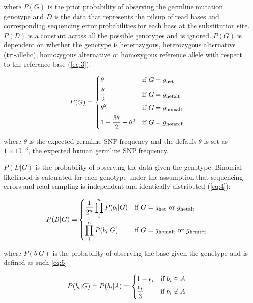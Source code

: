 where $P(G)$ is the prior probability of observing the germline mutation genotype and $D$ is the data that represents the pileup of read bases and corresponding sequencing error probabilities for each base at the substitution site. $P(D)$ is a constant across all the possible genotypes and is ignored. $P(G)$ is dependent on whether the genotype is heterozygous, heterozygous alternative (tri-allelic), homozygous alternative or homozygous reference allele with respect to the reference base (\ref{eq:3}):

\begin{equation} \label{eq:3}
 P(G)= 
 	\begin{dcases}
    	\theta & \text{if } G = g_{\text{het}} \\
	    \frac{\theta}{2} & \text{if } G = g_{\text{hetalt}} \\
		\theta^{2} & \text{if } G = g_{\text{homalt}} \\
		1 - \frac{3\theta}{2} - \theta^{2} & \text{if } G = g_{\text{homref}} \\
	\end{dcases} \smallskip
\end{equation}

where $\theta$ is the expected germline SNP frequency and the default $\theta$ is set as $1\times10^{-3}$, the expected human germline SNP frequency. 

$P(D|G)$ is the probability of observing the data given the genotype. Binomial likelihood is calculated for each genotype under the assumption that sequencing errors and read sampling is independent and identically distributed (\ref{eq:4}):

\begin{equation} \label{eq:4}
P(D|G) =  
	\begin{dcases}
    	\frac{1}{2^n}\prod_{i}^{n} P(b_{i}|G) & \text{if } G = g_{\text{het}} \text{ or } g_{\text{hetalt}} \\
	    \prod_{i}^{n} P(b_{i}|G) & \text{if } G = g_{\text{homalt}} \text{ or } g_{\text{homref}} \\
	\end{dcases}
\end{equation}

where $P(b|G)$ is the probability of observing the base given the genotype and is defined as such \ref{eq:5}

\begin{equation} \label{eq:5}
P(b_{i}|G) = P(b_{i}|A) = 
	\begin{dcases}
    	1 - \epsilon_{i} & \text{if } b_{i} \in A \\
	    \frac{\epsilon_{i}}{3} & \text{if } b_{i} \not\in A \\
	\end{dcases} \smallskip
\end{equation}

